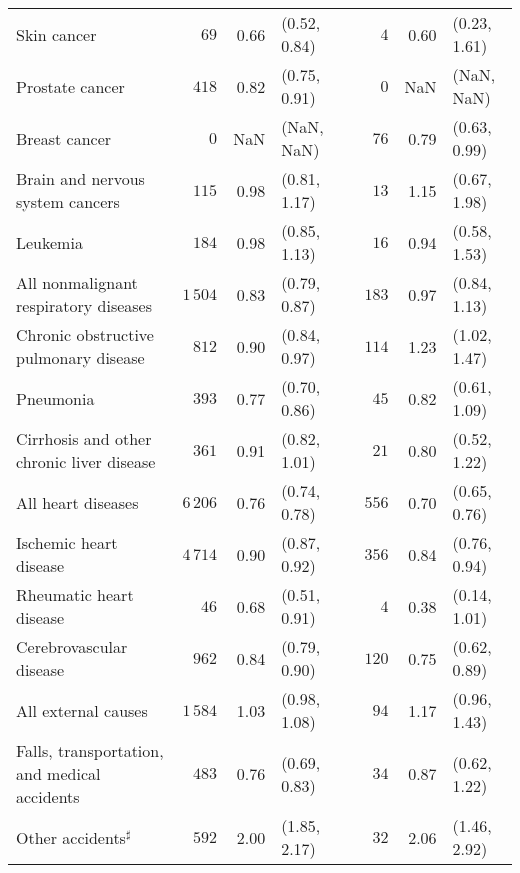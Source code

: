 \documentclass[]{article}
\begin{document}
\begin{table}[H]
\begin{tabular}{lrrlcrrl}
  \hspace{10pt}Skin cancer & $69$ & 0.66 &  (0.52, 0.84) &  & $4$ & 0.60 &  (0.23, 1.61) \\ 
  \hspace{10pt}Prostate cancer & $418$ & 0.82 &  (0.75, 0.91) &  & $0$ & NaN &  (NaN, NaN) \\ 
  \hspace{10pt}Breast cancer & $0$ & NaN &  (NaN, NaN) &  & $76$ & 0.79 &  (0.63, 0.99) \\ 
  \hspace{10pt}Brain and nervous system cancers & $115$ & 0.98 &  (0.81, 1.17) &  & $13$ & 1.15 &  (0.67, 1.98) \\ 
  Leukemia & $184$ & 0.98 &  (0.85, 1.13) &  & $16$ & 0.94 &  (0.58, 1.53) \\ 
  \hspace{10pt}All nonmalignant respiratory diseases & $1\,504$ & 0.83 &  (0.79, 0.87) &  & $183$ & 0.97 &  (0.84, 1.13) \\ 
  \hspace{10pt}Chronic obstructive pulmonary disease & $812$ & 0.90 &  (0.84, 0.97) &  & $114$ & 1.23 &  (1.02, 1.47) \\ 
  Pneumonia & $393$ & 0.77 &  (0.70, 0.86) &  & $45$ & 0.82 &  (0.61, 1.09) \\ 
  Cirrhosis and other chronic liver disease & $361$ & 0.91 &  (0.82, 1.01) &  & $21$ & 0.80 &  (0.52, 1.22) \\ 
  \hspace{10pt}All heart diseases & $6\,206$ & 0.76 &  (0.74, 0.78) &  & $556$ & 0.70 &  (0.65, 0.76) \\ 
  \hspace{10pt}Ischemic heart disease & $4\,714$ & 0.90 &  (0.87, 0.92) &  & $356$ & 0.84 &  (0.76, 0.94) \\ 
  Rheumatic heart disease & $46$ & 0.68 &  (0.51, 0.91) &  & $4$ & 0.38 &  (0.14, 1.01) \\ 
  Cerebrovascular disease & $962$ & 0.84 &  (0.79, 0.90) &  & $120$ & 0.75 &  (0.62, 0.89) \\ 
  \hspace{10pt}All external causes & $1\,584$ & 1.03 &  (0.98, 1.08) &  & $94$ & 1.17 &  (0.96, 1.43) \\ 
  \hspace{10pt}Falls, transportation, and medical accidents & $483$ & 0.76 &  (0.69, 0.83) &  & $34$ & 0.87 &  (0.62, 1.22) \\ 
  \hspace{10pt}Other accidents$^\sharp$ & $592$ & 2.00 &  (1.85, 2.17) &  & $32$ & 2.06 &  (1.46, 2.92) \\ 

\end{tabular}
\end{table}
\end{document}
